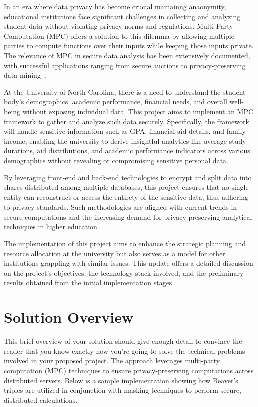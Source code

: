\documentclass[conference]{IEEEtran}
\begin{document}
In an era where data privacy has become crucial mainainng anaonymity, educational institutions face significant challenges in collecting and analyzing student data without violating privacy norms and regulations. Multi-Party Computation (MPC) offers a solution to this dilemma by allowing multiple parties to compute functions over their inputs while keeping those inputs private. The relevance of MPC in secure data analysis has been extensively documented, with successful applications ranging from secure auctions to privacy-preserving data mining~\cite{MPC1}.

At the University of North Carolina, there is a need to understand the student body's demographics, academic performance, financial needs, and overall well-being without exposing individual data. This project aims to implement an MPC framework to gather and analyze such data securely. Specifically, the framework will handle sensitive information such as GPA, financial aid details, and family income, enabling the university to derive insightful analytics like average study durations, aid distributions, and academic performance indicators across various demographics without revealing or compromising sensitive personal data.

By leveraging front-end and back-end technologies to encrypt and split data into shares distributed among multiple databases, this project ensures that no single entity can reconstruct or access the entirety of the sensitive data, thus adhering to privacy standards. Such methodologies are aligned with current trends in secure computations and the increasing demand for privacy-preserving analytical techniques in higher education.

The implementation of this project aims to enhance the strategic planning and resource allocation at the university but also serves as a model for other institutions grappling with similar issues. This update offers a detailed discussion on the project's objectives, the technology stack involved, and the preliminary results obtained from the initial implementation stages.

\section{Solution Overview}

This brief overview of your solution should give enough detail to convince the reader that you know exactly how you're going to solve the technical problems involved in your proposed project. The approach leverages multi-party computation (MPC) techniques to ensure privacy-preserving computations across distributed servers. Below is a sample implementation showing how Beaver's triples are utilized in conjunction with masking techniques to perform secure, distributed calculations.
\end{document}

